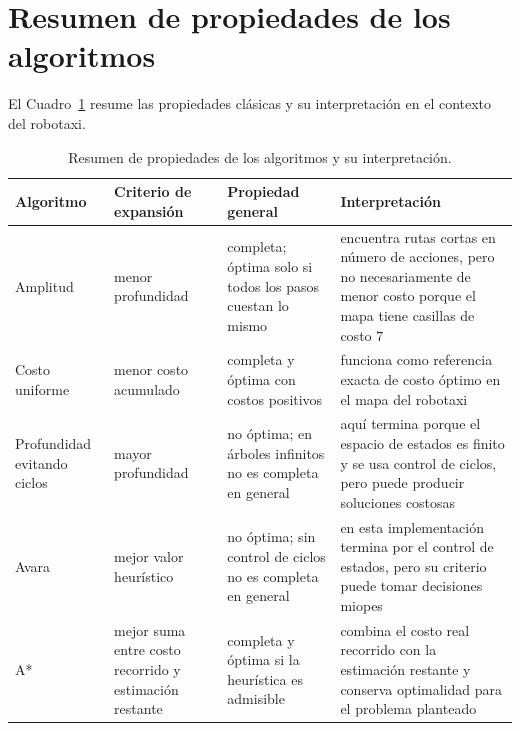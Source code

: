 \documentclass[12pt,a4paper]{article}
\begin{document}
\section{Resumen de propiedades de los algoritmos}
El Cuadro~\ref{tab:propiedades} resume las propiedades clásicas y su interpretación en el contexto del robotaxi.

\begin{table}[!ht]
    \centering
    \small
    \begin{tabularx}{\textwidth}{|>{\raggedright\arraybackslash}p{2.2cm}|>{\raggedright\arraybackslash}p{3cm}|>{\raggedright\arraybackslash}p{3.9cm}|>{\raggedright\arraybackslash}X|}
        \hline
        \textbf{Algoritmo} & \textbf{Criterio de expansión} & \textbf{Propiedad general} & \textbf{Interpretación} \\
        \hline
        Amplitud & menor profundidad & completa; óptima solo si todos los pasos cuestan lo mismo & encuentra rutas cortas en número de acciones, pero no necesariamente de menor costo porque el mapa tiene casillas de costo \(7\) \\
        \hline
        Costo uniforme & menor costo acumulado & completa y óptima con costos positivos & funciona como referencia exacta de costo óptimo en el mapa del robotaxi \\
        \hline
        Profundidad evitando ciclos & mayor profundidad & no óptima; en árboles infinitos no es completa en general & aquí termina porque el espacio de estados es finito y se usa control de ciclos, pero puede producir soluciones costosas \\
        \hline
        Avara & mejor valor heurístico & no óptima; sin control de ciclos no es completa en general & en esta implementación termina por el control de estados, pero su criterio puede tomar decisiones miopes \\
        \hline
        A* & mejor suma entre costo recorrido y estimación restante & completa y óptima si la heurística es admisible & combina el costo real recorrido con la estimación restante y conserva optimalidad para el problema planteado \\
        \hline
    \end{tabularx}
    \caption{Resumen de propiedades de los algoritmos y su interpretación.}
    \label{tab:propiedades}
\end{table}
\end{document}
